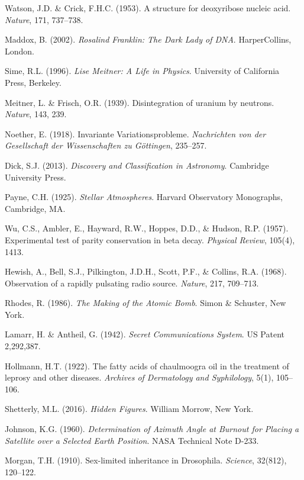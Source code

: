 \documentclass[12pt,a4paper]{article}
\begin{document}
\begin{enumerate}[leftmargin=*, label={[\arabic*]}, itemsep=6pt]
\sloppy

\item Watson, J.D. \& Crick, F.H.C. (1953). A structure for deoxyribose nucleic acid. \textit{Nature}, 171, 737--738.
\item Maddox, B. (2002). \textit{Rosalind Franklin: The Dark Lady of DNA}. HarperCollins, London.
\item Sime, R.L. (1996). \textit{Lise Meitner: A Life in Physics}. University of California Press, Berkeley.
\item Meitner, L. \& Frisch, O.R. (1939). Disintegration of uranium by neutrons. \textit{Nature}, 143, 239.
\item Noether, E. (1918). Invariante Variationsprobleme. \textit{Nachrichten von der Gesellschaft der Wissenschaften zu G\"{o}ttingen}, 235--257.
\item Dick, S.J. (2013). \textit{Discovery and Classification in Astronomy}. Cambridge University Press.
\item Payne, C.H. (1925). \textit{Stellar Atmospheres}. Harvard Observatory Monographs, Cambridge, MA.
\item Wu, C.S., Ambler, E., Hayward, R.W., Hoppes, D.D., \& Hudson, R.P. (1957). Experimental test of parity conservation in beta decay. \textit{Physical Review}, 105(4), 1413.
\item Hewish, A., Bell, S.J., Pilkington, J.D.H., Scott, P.F., \& Collins, R.A. (1968). Observation of a rapidly pulsating radio source. \textit{Nature}, 217, 709--713.
\item Rhodes, R. (1986). \textit{The Making of the Atomic Bomb}. Simon \& Schuster, New York.
\item Lamarr, H. \& Antheil, G. (1942). \textit{Secret Communications System}. US Patent 2,292,387.
\item Hollmann, H.T. (1922). The fatty acids of chaulmoogra oil in the treatment of leprosy and other diseases. \textit{Archives of Dermatology and Syphilology}, 5(1), 105--106.
\item Shetterly, M.L. (2016). \textit{Hidden Figures}. William Morrow, New York.
\item Johnson, K.G. (1960). \textit{Determination of Azimuth Angle at Burnout for Placing a Satellite over a Selected Earth Position}. NASA Technical Note D-233.
\item Morgan, T.H. (1910). Sex-limited inheritance in Drosophila. \textit{Science}, 32(812), 120--122.

\end{enumerate}
\end{document}
